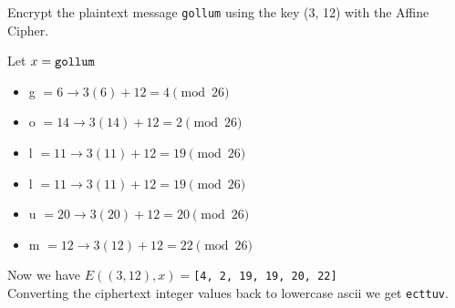 \begin{ex}
  Encrypt the plaintext message \verb!gollum! using the key (3, 12) with the Affine Cipher.

  Let $x = \verb!gollum!$
  \begin{center}
      \begin{itemize}
      \item g $ = 6 \to 3(6) + 12 = 4 \pmod{26}$ \\
      \item o $= 14 \to 3(14) + 12 = 2 \pmod{26}$ \\
      \item l $= 11 \to 3(11) + 12 = 19 \pmod{26}$ \\
      \item l $= 11 \to 3(11) + 12 = 19 \pmod{26}$ \\
      \item u $= 20 \to 3(20) + 12 = 20 \pmod{26}$ \\
      \item m $= 12 \to 3(12) + 12 = 22 \pmod{26}$ \\
      \end{itemize}
  \end{center}
  Now we have $E((3, 12), x) = $\Verb![4, 2, 19, 19, 20, 22]! \\
  Converting the ciphertext integer values back to lowercase ascii
  we get
  \Verb!ecttuv!.
\end{ex}
